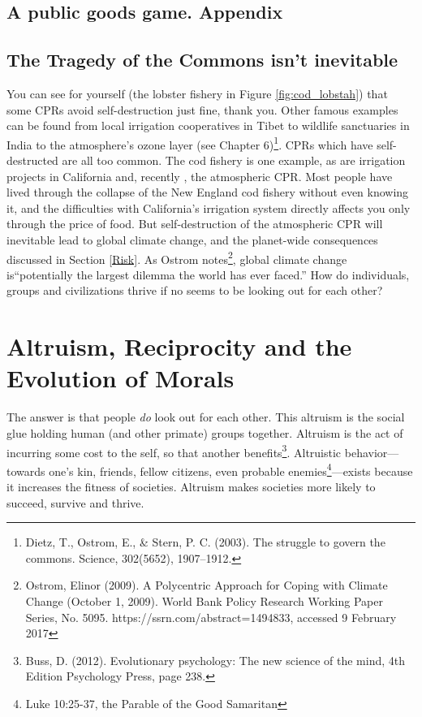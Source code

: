 \documentclass[amstex,12pt]{book}
\begin{document}
\subsection{A public goods game. Appendix}
\subsection{The Tragedy of the Commons isn't inevitable}
You can see for yourself (the lobster fishery in Figure \ref{fig:cod_lobstah}) that some CPRs avoid self-destruction just fine, thank you. Other famous examples can be found from local irrigation cooperatives in Tibet to wildlife sanctuaries in India to the atmosphere's ozone layer (see Chapter 6)\footnote{Dietz, T., Ostrom, E., \& Stern, P. C. (2003). The struggle to govern the commons. Science, 302(5652), 1907–1912.}. CPRs which have self-destructed are all too common. The cod fishery is one example, as are irrigation projects in California and, recently , the atmospheric CPR. Most people have lived through the collapse of the New England cod fishery without even knowing it, and the difficulties with California's irrigation system directly affects you only through the price of food. But self-destruction of the atmospheric CPR will inevitable lead to global climate change, and the planet-wide consequences discussed in Section \ref{Risk}. As Ostrom notes\footnote{Ostrom, Elinor (2009). A Polycentric Approach for Coping with Climate Change (October 1, 2009). World Bank Policy Research Working Paper Series, No. 5095. https://ssrn.com/abstract=1494833, accessed 9 February 2017}, global climate change is``potentially the largest dilemma the world has ever faced.'' How do individuals, groups and civilizations thrive if no seems to be looking out for each other?\\ 

\section{Altruism, Reciprocity and the Evolution of Morals}
The answer is that people \emph{do} look out for each other. This altruism is the social glue holding human (and other primate) groups together. Altruism is the act of incurring some cost to the self, so that another benefits\footnote{Buss, D. (2012). Evolutionary psychology: The new science of the mind, 4th Edition Psychology Press, page 238.}. Altruistic behavior---towards one's kin, friends, fellow citizens, even probable enemies\footnote{Luke 10:25-37, the Parable of the Good Samaritan}---exists because it increases the fitness of societies. Altruism makes societies more likely to succeed, survive and thrive. 
\end{document}
